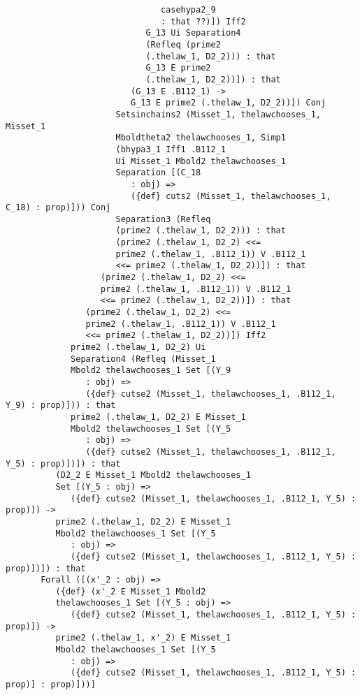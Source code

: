 \documentclass[12pt]{article}
\begin{document}
\begin{verbatim}
                               casehypa2_9 
                               : that ??)]) Iff2 
                            G_13 Ui Separation4 
                            (Refleq (prime2 
                            (.thelaw_1, D2_2))) : that 
                            G_13 E prime2 
                            (.thelaw_1, D2_2))]) : that 
                         (G_13 E .B112_1) -> 
                         G_13 E prime2 (.thelaw_1, D2_2))]) Conj 
                      Setsinchains2 (Misset_1, thelawchooses_1, Misset_1 
                      Mboldtheta2 thelawchooses_1, Simp1 
                      (bhypa3_1 Iff1 .B112_1 
                      Ui Misset_1 Mbold2 thelawchooses_1 
                      Separation [(C_18 
                         : obj) => 
                         ({def} cuts2 (Misset_1, thelawchooses_1, C_18) : prop)])) Conj 
                      Separation3 (Refleq 
                      (prime2 (.thelaw_1, D2_2))) : that 
                      (prime2 (.thelaw_1, D2_2) <<= 
                      prime2 (.thelaw_1, .B112_1)) V .B112_1 
                      <<= prime2 (.thelaw_1, D2_2))]) : that 
                   (prime2 (.thelaw_1, D2_2) <<= 
                   prime2 (.thelaw_1, .B112_1)) V .B112_1 
                   <<= prime2 (.thelaw_1, D2_2))]) : that 
                (prime2 (.thelaw_1, D2_2) <<= 
                prime2 (.thelaw_1, .B112_1)) V .B112_1 
                <<= prime2 (.thelaw_1, D2_2))]) Iff2 
             prime2 (.thelaw_1, D2_2) Ui 
             Separation4 (Refleq (Misset_1 
             Mbold2 thelawchooses_1 Set [(Y_9 
                : obj) => 
                ({def} cutse2 (Misset_1, thelawchooses_1, .B112_1, Y_9) : prop)])) : that 
             prime2 (.thelaw_1, D2_2) E Misset_1 
             Mbold2 thelawchooses_1 Set [(Y_5 
                : obj) => 
                ({def} cutse2 (Misset_1, thelawchooses_1, .B112_1, Y_5) : prop)])]) : that 
          (D2_2 E Misset_1 Mbold2 thelawchooses_1 
          Set [(Y_5 : obj) => 
             ({def} cutse2 (Misset_1, thelawchooses_1, .B112_1, Y_5) : prop)]) -> 
          prime2 (.thelaw_1, D2_2) E Misset_1 
          Mbold2 thelawchooses_1 Set [(Y_5 
             : obj) => 
             ({def} cutse2 (Misset_1, thelawchooses_1, .B112_1, Y_5) : prop)])]) : that 
       Forall ([(x'_2 : obj) => 
          ({def} (x'_2 E Misset_1 Mbold2 
          thelawchooses_1 Set [(Y_5 : obj) => 
             ({def} cutse2 (Misset_1, thelawchooses_1, .B112_1, Y_5) : prop)]) -> 
          prime2 (.thelaw_1, x'_2) E Misset_1 
          Mbold2 thelawchooses_1 Set [(Y_5 
             : obj) => 
             ({def} cutse2 (Misset_1, thelawchooses_1, .B112_1, Y_5) : prop)] : prop)]))]



\end{verbatim}
\end{document}
